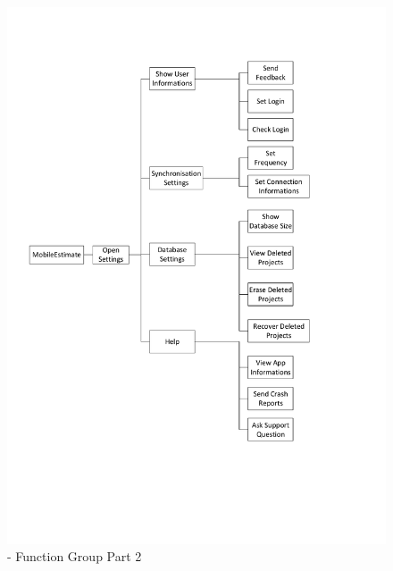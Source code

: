 \begin{figure}[h] 
	\centering 
	\includegraphics[width=13cm]{images/ScreenOverview2.pdf} 
	\caption{- Function Group Part 2} 
	\label{completefunctiongroup2}
\end{figure}
